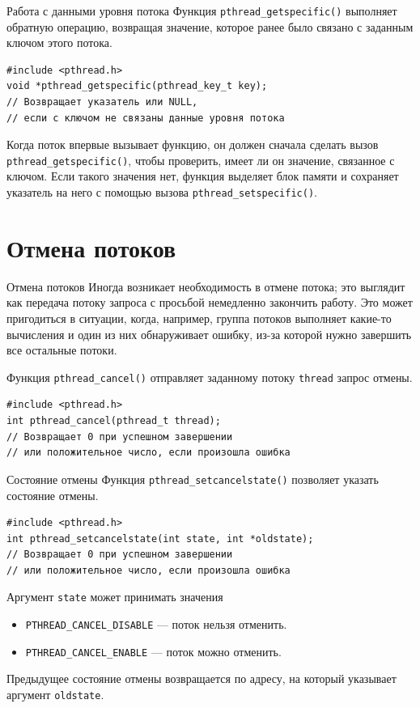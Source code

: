 \documentclass{beamer}
\begin{document}
\begin{frame}[fragile]{Работа с данными уровня потока}
    Функция \texttt{pthread\_getspecific()} выполняет обратную операцию, возвращая значение, которое ранее было связано с заданным ключом этого потока.
    \begin{verbatim}
#include <pthread.h>
void *pthread_getspecific(pthread_key_t key);
// Возвращает указатель или NULL, 
// если с ключом не связаны данные уровня потока
    \end{verbatim}
    
    Когда поток впервые вызывает функцию, он должен сначала сделать вызов \texttt{pthread\_getspecific()}, чтобы проверить, имеет ли он значение, связанное с ключом. Если такого значения нет, функция выделяет блок памяти и сохраняет указатель на него с помощью вызова \texttt{pthread\_setspecific()}. 
\end{frame}

\section{Отмена потоков}

\begin{frame}[fragile]{Отмена потоков}
    Иногда возникает необходимость в отмене потока; это выглядит как передача потоку запроса с просьбой немедленно закончить работу. Это может пригодиться в ситуации, когда, например, группа потоков выполняет какие-то вычисления и один из них обнаруживает ошибку, из-за которой нужно завершить все остальные потоки.
    
    Функция \texttt{pthread\_cancel()} отправляет заданному потоку \texttt{thread} запрос отмены.
    \begin{verbatim}
#include <pthread.h>
int pthread_cancel(pthread_t thread);
// Возвращает 0 при успешном завершении 
// или положительное число, если произошла ошибка
    \end{verbatim}
\end{frame}

\begin{frame}[fragile]{Состояние отмены}
    Функция \texttt{pthread\_setcancelstate()} позволяет указать состояние отмены.
    \begin{verbatim}
#include <pthread.h>
int pthread_setcancelstate(int state, int *oldstate);
// Возвращает 0 при успешном завершении 
// или положительное число, если произошла ошибка
    \end{verbatim}
    
    Аргумент \texttt{state} может принимать значения
    \begin{itemize}
        \item \texttt{PTHREAD\_CANCEL\_DISABLE} — поток нельзя отменить.
        \item \texttt{PTHREAD\_CANCEL\_ENABLE} — поток можно отменить.
    \end{itemize}
    
    Предыдущее состояние отмены возвращается по адресу, на который указывает аргумент \texttt{oldstate}.
\end{frame}
\end{document}
